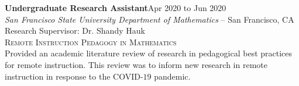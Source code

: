 \documentclass[hidelinks, 10pt]{article}
\begin{document}
{{    %


    \begin{minipage}[ct]{0.9\linewidth}
        \textbf{Undergraduate Research Assistant}\hfill Apr 2020 to Jun 2020\\
        \emph{San Francisco State University Department of Mathematics} -- San Francisco, CA\\
        Research Supervisor: Dr. Shandy Hauk\\
        {\textsc{Remote Instruction Pedagogy in Mathematics}}
        \vspace{1mm}\\
        Provided an academic literature review of research in pedagogical best practices for remote instruction.  This review was to inform
        new research in remote instruction in response to the COVID-$19$ pandemic.
    \end{minipage}

}}
\end{document}

